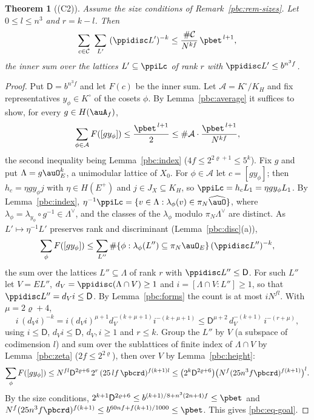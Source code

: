 \documentclass[10pt]{amsart}
\newtheorem{theorem}{Theorem}[section]
\theoremstyle{definition}
\theoremstyle{remark}
\begin{document}
\begin{theorem}[(C2)]\label{pbc:C2}
Assume the size conditions of Remark~\ref{pbc:rem-sizes}. Let $0\le l\le n^3$ and $r=k-l$. Then
\[
\sum_{c\in\mathcal C}\ \sum_{L'}\ (\ppidisc L')^{-k}\le\frac{\#\mathcal C}{N^{kf}}\,\pbet^{\,l+1},
\]
the inner sum over the lattices $L'\subseteq\ppiLc$ of rank $r$ with $\ppidisc L'\le b^{n^3f}$.
\end{theorem}
\begin{proof}
Put $\mathsf D=b^{n^3f}$ and let $F(c)$ be the inner sum. Let $\mathcal A=K^\circ/K_H$ and fix
representatives $y_\phi\in K^\circ$ of the cosets $\phi$. By Lemma~\ref{pbc:average} it suffices to show,
for every $g\in H(\auA_f)$,
\begin{equation}\label{pbc:eq-goal}
\sum_{\phi\in\mathcal A}F([gy_\phi])\le\frac{\pbet^{\,l+1}}2\le\#\mathcal A\cdot\frac{\pbet^{\,l+1}}{N^{kf}},
\end{equation}
the second inequality being Lemma~\ref{pbc:index} ($4f\le2^{2\varrho+1}\le5^k$). Fix $g$ and put $\Lambda=g
\auO_E^k$, a unimodular lattice of $X_0$. For $\phi\in\mathcal A$ let $c=[gy_\phi]$; then $h_c=\eta g y_\phi j$
with $\eta\in H(E^+)$ and $j\in J_X\subseteq K_H$, so $\ppiLc=h_cL_1=\eta gy_\phi L_1$. By
Lemma~\ref{pbc:index}, $\eta^{-1}\ppiLc=\{v\in\Lambda:\lambda_\phi(v)\in\pi_N\widehat\auO\}$, where
$\lambda_\phi=\lambda_{y_\phi}\circ g^{-1}\in\Lambda^\vee$, and the classes of the $\lambda_\phi$ modulo $\pi_N
\Lambda^\vee$ are distinct. As $L'\mapsto\eta^{-1}L'$ preserves rank and discriminant
(Lemma~\ref{pbc:disc}(a)),
\[
\sum_\phi F([gy_\phi])\le\sum_{L''}\#\{\phi:\lambda_\phi(L'')\subseteq\pi_N\auO_E\}\,(\ppidisc L'')^{-k},
\]
the sum over the lattices $L''\subseteq\Lambda$ of rank $r$ with $\ppidisc L''\le\mathsf D$. For such $L''$ let
$V=EL''$, $d_V=\ppidisc(\Lambda\cap V)\ge1$ and $i=[\Lambda\cap V:L'']\ge1$, so that $\ppidisc L''=d_Vi\le\mathsf
D$. By Lemma~\ref{pbc:forms} the count is at most $iN^{fl}$. With $\mu=2\varrho+4$,
\[
i\,(d_Vi)^{-k}=i(d_Vi)^{\mu+1}d_V^{-(k+\mu+1)}i^{-(k+\mu+1)}\le\mathsf D^{\mu+2}\,d_V^{-(k+1)}\,i^{-(r+\mu)},
\]
using $i\le\mathsf D$, $d_Vi\le\mathsf D$, $d_V,i\ge1$ and $r\le k$. Group the $L''$ by $V$ (a subspace of
codimension $l$) and sum over the sublattices of finite index of $\Lambda\cap V$ by Lemma~\ref{pbc:zeta}
($2f\le2^{2\varrho}$), then over $V$ by Lemma~\ref{pbc:height}:
\[
\sum_\phi F([gy_\phi])\le N^{fl}\mathsf D^{2\varrho+6}\,2^r\,(25\,lf\,\pbcrd)^{f(k+1)l}
\le\bigl(2^{k}\mathsf D^{2\varrho+6}\bigr)\bigl(N^f(25n^3f\pbcrd)^{f(k+1)}\bigr)^l .
\]
By the size conditions, $2^{k+1}\mathsf D^{2\varrho+6}\le b^{(k+1)/8+n^3(2n+4)f}\le\pbet$ and $N^f(25n^3f
\pbcrd)^{f(k+1)}\le b^{60nf+f(k+1)/1000}\le\pbet$. This gives \eqref{pbc:eq-goal}.
\end{proof}
\end{document}
